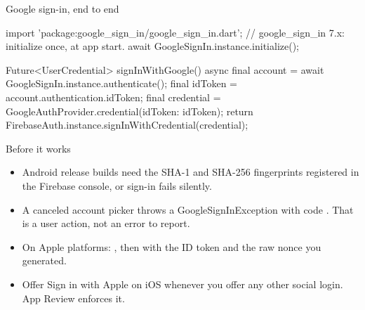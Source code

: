 \documentclass[10pt,aspectratio=169,t]{beamer}
\begin{document}
\begin{frame}[fragile,eyebrow=OAuth]{Google sign-in, end to end}
\begin{dart}
import 'package:google_sign_in/google_sign_in.dart';
// google_sign_in 7.x: initialize once, at app start.
await GoogleSignIn.instance.initialize();

Future<UserCredential> signInWithGoogle() async {
  final account = await GoogleSignIn.instance.authenticate();
  final idToken = account.authentication.idToken;
  final credential =
      GoogleAuthProvider.credential(idToken: idToken);
  return FirebaseAuth.instance.signInWithCredential(credential);
}
\end{dart}
\end{frame}

\begin{frame}[eyebrow=OAuth]{Before it works}
  \vskip 3mm
  \begin{itemize}
    \item Android release builds need the SHA-1 and SHA-256 fingerprints registered in the Firebase console, or sign-in fails silently.
    \item A canceled account picker throws a GoogleSignInException with code . That is a user action, not an error to report.
    \item On Apple platforms: , then  with the ID token and the raw nonce you generated.
    \item Offer Sign in with Apple on iOS whenever you offer any other social login. App Review enforces it.
  \end{itemize}
\end{frame}
\end{document}
